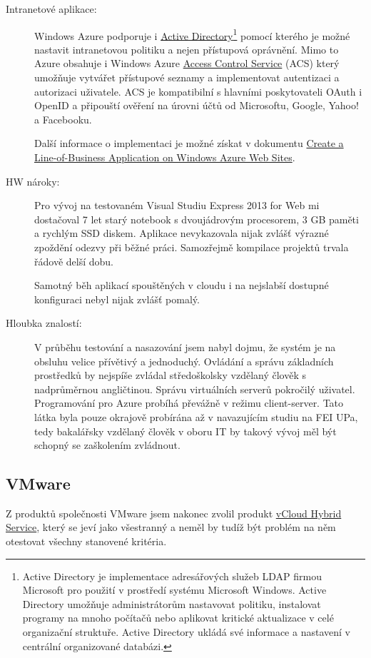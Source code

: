 \begin{description}
	\item [Intranetové aplikace:] Windows Azure podporuje i \href{http://cs.wikipedia.org/w/index.php?title=Active_Directory&oldid=11171033}{Active Directory}\footnote{Active Directory je implementace adresářových služeb LDAP firmou Microsoft pro použití v prostředí systému Microsoft Windows. Active Directory umožňuje administrátorům nastavovat politiku, instalovat programy na mnoho počítačů nebo aplikovat kritické aktualizace v celé organizační struktuře. Active Directory ukládá své informace a nastavení v centrální organizované databázi.\cite{wiki:activeDirectory}} pomocí kterého je možné nastavit intranetovou politiku a nejen přístupová oprávnění. Mimo to Azure obsahuje i Windows Azure \href{http://msdn.microsoft.com/library/windowsazure/hh147631.aspx}{Access Control Service} (ACS) který umožňuje vytvářet přístupové seznamy a implementovat autentizaci a autorizaci uživatele. ACS je kompatibilní s hlavními poskytovateli OAuth i OpenID a připouští ověření na úrovni účtů od Microsoftu, Google, Yahoo! a Facebooku.\cite{azure:acs}

	Další informace o implementaci je možné získat v dokumentu \href{http://www.windowsazure.com/en-us/documentation/articles/web-sites-business-application-solution-overview/}{Create a Line-of-Business Application on Windows Azure Web Sites}\cite{azure:secureApps}.
	\item [HW nároky:] Pro vývoj na testovaném Visual Studiu Express 2013 for Web mi dostačoval 7 let starý notebook s dvoujádrovým procesorem, 3 GB paměti a rychlým SSD diskem. Aplikace nevykazovala nijak zvlášť výrazné zpoždění odezvy při běžné práci. Samozřejmě kompilace projektů trvala řádově delší dobu.

Samotný běh aplikací spouštěných v cloudu i na nejslabší dostupné konfiguraci nebyl nijak zvlášť pomalý.
	\item [Hloubka znalostí:] V průběhu testování a nasazování jsem nabyl dojmu, že systém je na obsluhu velice přívětivý a jednoduchý. Ovládání a správu základních prostředků by nejspíše zvládal středoškolsky vzdělaný člověk s nadprůměrnou angličtinou. Správu virtuálních serverů pokročilý uživatel. Programování pro Azure probíhá převážně v režimu client-server. Tato látka byla pouze okrajově probírána až v navazujícím studiu na FEI UPa, tedy bakalářsky vzdělaný člověk v oboru IT by takový vývoj měl být schopný se zaškolením zvládnout.
\end{description}

\subsection{VMware}
Z produktů společnosti VMware jsem nakonec zvolil produkt \href{http://vcloud.vmware.com/}{vCloud Hybrid Service}, který se jeví jako všestranný a neměl by tudíž být problém na něm otestovat všechny stanovené kritéria.

